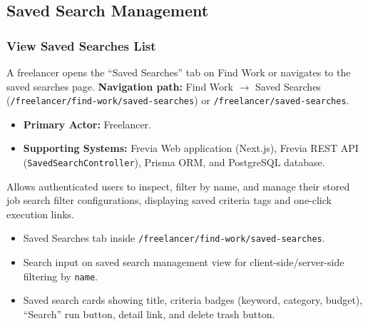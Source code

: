 
\subsection{Saved Search Management}

\subsubsection{View Saved Searches List}

A freelancer opens the ``Saved Searches'' tab on Find Work or navigates to the saved searches page.\newline
\textbf{Navigation path:} Find Work $\rightarrow$ Saved Searches (\texttt{/freelancer/find-work/saved-searches}) or \texttt{/freelancer/saved-searches}.


\begin{itemize}[leftmargin=1.6em,topsep=3pt,itemsep=2pt,parsep=0pt,label=$\bullet$]
    \item \textbf{Primary Actor:} Freelancer.
    \item \textbf{Supporting Systems:} Frevia Web application (Next.js), Frevia REST API (\texttt{SavedSearchController}), Prisma ORM, and PostgreSQL database.
\end{itemize}

\noindent Allows authenticated users to inspect, filter by name, and manage their stored job search filter configurations, displaying saved criteria tags and one-click execution links.

\begin{itemize}[leftmargin=1.6em,topsep=3pt,itemsep=2pt,parsep=0pt,label=$\bullet$]
    \item Saved Searches tab inside \texttt{/freelancer/find-work/saved-searches}.
    \item Search input on saved search management view for client-side/server-side filtering by \texttt{name}.
    \item Saved search cards showing title, criteria badges (keyword, category, budget), ``Search'' run button, detail link, and delete trash button.
\end{itemize}

